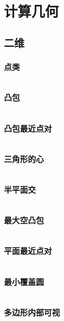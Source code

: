 \section{计算几何}

\subsection{二维}
\subsubsection{点类}
\inputminted{cpp}{\source/geometry/2d/basis.cpp}
\subsubsection{凸包}
\inputminted{cpp}{\source/geometry/2d/convex.cpp}
\subsubsection{凸包最近点对}
\inputminted{cpp}{\source/geometry/2d/convex-full.cpp}
\subsubsection{三角形的心}
\inputminted{cpp}{\source/geometry/2d/triangle.cpp}
\subsubsection{半平面交}
\inputminted{cpp}{\source/geometry/2d/half-plane-intersection.cpp}
\subsubsection{最大空凸包}
\inputminted{cpp}{\source/geometry/2d/max-convex.cpp}
\subsubsection{平面最近点对}
\inputminted{cpp}{\source/geometry/2d/closest.cpp}
\subsubsection{最小覆盖圆}
\inputminted{cpp}{\source/geometry/2d/mincircle.cpp}
\subsubsection{多边形内部可视}
\inputminted{cpp}{\source/geometry/2d/sight.cpp}

